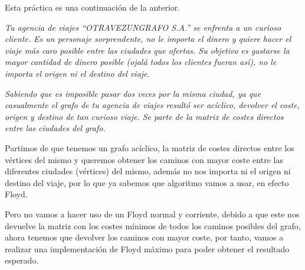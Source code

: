 Esta práctica es una continuación de la anterior.

\textbf{\large{}}\textit{ Tu agencia de viajes “OTRAVEZUNGRAFO S.A.” se enfrenta a un curioso cliente. Es un personaje sorprendente, no le importa el dinero y quiere hacer el viaje más caro posible entre las ciudades que ofertas. Su objetivo es gastarse la mayor cantidad de dinero posible (ojalá todos los clientes fueran así), no le importa el origen ni el destino del viaje.}

\textit{Sabiendo que es imposible pasar dos veces por la misma ciudad, ya que casualmente el grafo de tu agencia de viajes resultó ser acíclico, devolver el coste, origen y destino de tan curioso viaje. Se parte de la matriz de costes directos entre las ciudades del grafo.}

Partimos de que tenemos un grafo acíclico, la matriz de costes directos entre los vértices del mismo y queremos obtener los caminos con mayor coste entre las diferentes ciudades (vértices) del mismo, además no nos importa ni el origen ni destino del viaje, por lo que ya sabemos que algoritmo vamos a usar, en efecto Floyd.

Pero no vamos a hacer uso de un Floyd normal y corriente, debido a que este nos devuelve la matriz con los costes mínimos de todos los caminos posibles del grafo, ahora tenemos que devolver los caminos con mayor coste, por tanto, vamos a realizar una implementación de Floyd máximo para poder obtener el resultado esperado.

